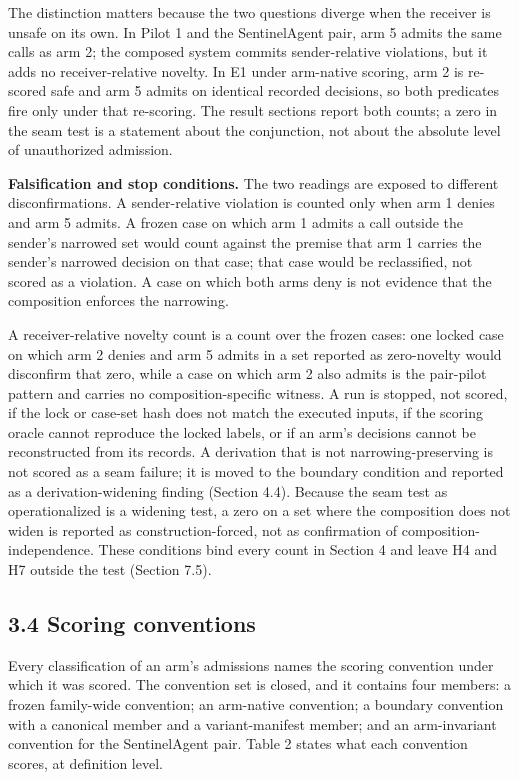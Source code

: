 \documentclass[
  10pt,
]{article}
\renewcommand{\_}{\allowbreak\origunderscore}
\begin{document}
The distinction matters because the two questions diverge when the
receiver is unsafe on its own. In Pilot 1 and the SentinelAgent pair,
arm 5 admits the same calls as arm 2; the composed system commits
sender-relative violations, but it adds no receiver-relative novelty. In
E1 under arm-native scoring, arm 2 is re-scored safe and arm 5 admits on
identical recorded decisions, so both predicates fire only under that
re-scoring. The result sections report both counts; a zero in the seam
test is a statement about the conjunction, not about the absolute level
of unauthorized admission.

\textbf{Falsification and stop conditions.} The two readings are exposed
to different disconfirmations. A sender-relative violation is counted
only when arm 1 denies and arm 5 admits. A frozen case on which arm 1
admits a call outside the sender's narrowed set would count against the
premise that arm 1 carries the sender's narrowed decision on that case;
that case would be reclassified, not scored as a violation. A case on
which both arms deny is not evidence that the composition enforces the
narrowing.

A receiver-relative novelty count is a count over the frozen cases: one
locked case on which arm 2 denies and arm 5 admits in a set reported as
zero-novelty would disconfirm that zero, while a case on which arm 2
also admits is the pair-pilot pattern and carries no
composition-specific witness. A run is stopped, not scored, if the lock
or case-set hash does not match the executed inputs, if the scoring
oracle cannot reproduce the locked labels, or if an arm's decisions
cannot be reconstructed from its records. A derivation that is not
narrowing-preserving is not scored as a seam failure; it is moved to the
boundary condition and reported as a derivation-widening finding
(Section 4.4). Because the seam test as operationalized is a widening
test, a zero on a set where the composition does not widen is reported
as construction-forced, not as confirmation of composition-independence.
These conditions bind every count in Section 4 and leave H4 and H7
outside the test (Section 7.5).

\subsection{3.4 Scoring conventions}\label{scoring-conventions}

Every classification of an arm's admissions names the scoring convention
under which it was scored. The convention set is closed, and it contains
four members: a frozen family-wide convention; an arm-native convention;
a boundary convention with a canonical member and a variant-manifest
member; and an arm-invariant convention for the SentinelAgent pair.
Table 2 states what each convention scores, at definition level.
\end{document}
